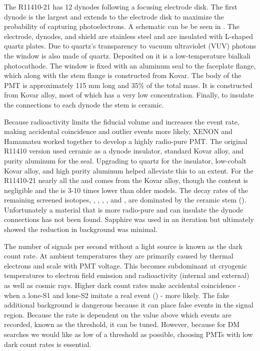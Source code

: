The R11410-21 has 12 dynodes following a focusing electrode disk.  The first dynode is the largest and extends to the electrode disk to
maximize the probability of capturing photoelectrons.  A schematic can be be seen in .  The electrode,
dynodes, and shield are stainless steel and are insulated with L-shaped quartz plates.  Due to quartz's transparency to vacuum
ultraviolet (VUV) photons the window is also made of quartz.  Deposited on it is a low-temperature bialkali
photocathode.  The window is fixed with an aluminum seal to the faceplate flange, which along with the stem flange is constructed from
Kovar.  The body of the PMT is approximately 115 mm long and 35\% of the total mass.  It is constructed from Kovar alloy, most of which
has a very low  concentration.  Finally, to insulate the connections to each dynode the stem is ceramic.

Because radioactivity limits the fiducial volume and increases the event rate, making accidental coincidence and outlier events more
likely, XENON and Hamamatsu worked together to develop a highly radio-pure PMT.  The original R11410 version used ceramic as a dynode
insulator, standard Kovar alloy, and
purity aluminum for the seal.  Upgrading to quartz for the insulator, low-cobalt Kovar alloy, and high purity aluminum helped alleviate
this to an extent.  For the R11410-21 nearly all the  and  comes from the Kovar alloy, though the 
content is negligible and the  is 3-10 times lower than older models.  The decay rates of the remaining screened isotopes,
,
, , , and , are dominated by the ceramic stem ().  Unfortunately a
material that is more radio-pure and can insulate the dynode connections has not been found.  Sapphire was used in an iteration but
ultimately showed the reduction in background was minimal.

The number of signals per second without a light source is known as the dark count rate.  At ambient temperatures they
are primarily caused by thermal electrons and scale with PMT voltage.  This becomes subdominant at
cryogenic temperatures to electron field emission and radioactivity (internal and external) as well as cosmic rays.  Higher dark count
rates make accidental coincidence - when a lone-S1 and lone-S2 imitate a real event () - more likely.  The
fake additional background is dangerous because it can place false events in the signal region.  Because the rate is dependent on the
value above which events are recorded, known as the threshold, it can be tuned.  However, because
for DM searches we would like as low of a threshold as possible, choosing PMTs with low dark count rates is essential.

